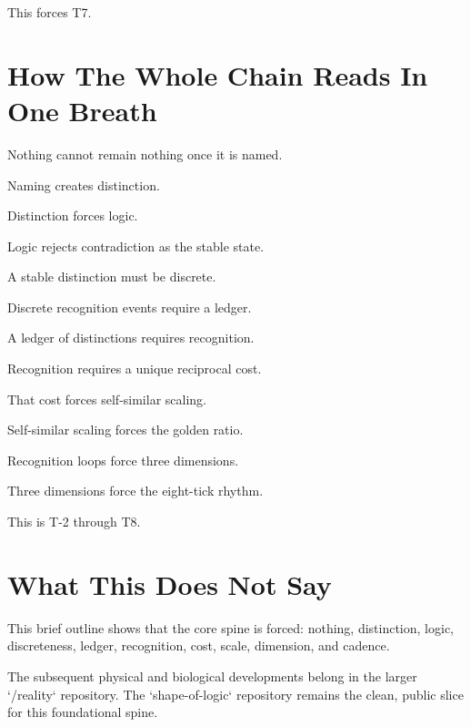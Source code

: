 \documentclass[11pt]{article}
\begin{document}
This forces T7.

\section{How The Whole Chain Reads In One Breath}

Nothing cannot remain nothing once it is named.

Naming creates distinction.

Distinction forces logic.

Logic rejects contradiction as the stable state.

A stable distinction must be discrete.

Discrete recognition events require a ledger.

A ledger of distinctions requires recognition.

Recognition requires a unique reciprocal cost.

That cost forces self-similar scaling.

Self-similar scaling forces the golden ratio.

Recognition loops force three dimensions.

Three dimensions force the eight-tick rhythm.

This is T-2 through T8.

\section{What This Does Not Say}

This brief outline shows that the core spine is forced: nothing, distinction, logic, discreteness, ledger, recognition, cost, scale, dimension, and cadence.

The subsequent physical and biological developments belong in the larger `/reality` repository. The `shape-of-logic` repository remains the clean, public slice for this foundational spine.
\end{document}
